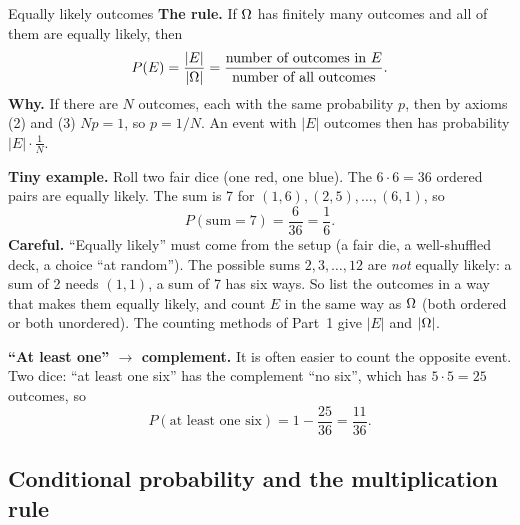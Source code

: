 \begin{key}{Equally likely outcomes}
	\setlength{\parskip}{5pt}
	\textbf{The rule.} If $\Omega$ has finitely many outcomes and all of them
	are equally likely, then
	\[ P(E)=\frac{|E|}{|\Omega|}=\frac{\text{number of outcomes in }E}
		{\text{number of all outcomes}}. \]
	\textbf{Why.} If there are $N$ outcomes, each with the same probability
	$p$, then by axioms (2) and (3) $Np=1$, so $p=1/N$. An event with $|E|$
	outcomes then has probability $|E|\cdot\frac1N$.

	\textbf{Tiny example.} Roll two fair dice (one red, one blue). The
	$6\cdot6=36$ ordered pairs are equally likely. The sum is 7 for
	$(1,6),(2,5),\dots,(6,1)$, so
	\[ P(\text{sum}=7)=\frac{6}{36}=\frac16. \]
	\textbf{Careful.} ``Equally likely'' must come from the setup (a fair
	die, a well-shuffled deck, a choice ``at random''). The possible sums
	$2,3,\dots,12$ are \emph{not} equally likely: a sum of 2 needs $(1,1)$,
	a sum of 7 has six ways. So list the outcomes in a way that makes them
	equally likely, and count $E$ in the same way as $\Omega$ (both ordered or
	both unordered). The counting methods of Part~1 give $|E|$ and $|\Omega|$.

	\textbf{``At least one'' $\to$ complement.} It is often easier to count
	the opposite event. Two dice: ``at least one six'' has the complement
	``no six'', which has $5\cdot5=25$ outcomes, so
	\[ P(\text{at least one six})=1-\frac{25}{36}=\frac{11}{36}. \]
\end{key}


\subsection*{Conditional probability and the multiplication rule}

